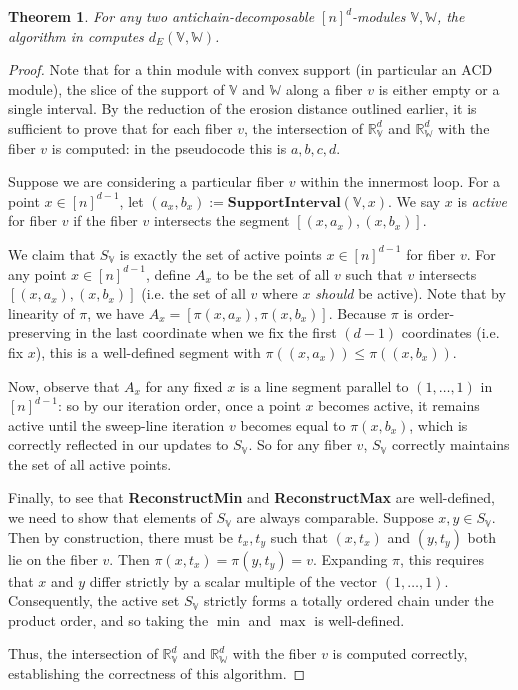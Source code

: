 \documentclass[a4paper,UKenglish,thm-restate]{article}
\newtheorem{theorem}{Theorem}[section]
\theoremstyle{definition}
\def\bbv{\mathbb{V}}
\def\bbw{\mathbb{W}}
\begin{document}
            \begin{theorem}
                For any two antichain-decomposable $[n]^d$-modules $\bbv, \bbw$, the algorithm in  computes $d_E(\bbv, \bbw)$.
            \end{theorem}
            \begin{proof}
                Note that for a thin module with convex support (in particular an ACD module), the slice of the support of $\bbv$ and $\bbw$ along a fiber $v$ is either empty or a single interval. By the reduction of the erosion distance outlined earlier, it is sufficient to prove that for each fiber $v$, the intersection of $\mathbb{R}_\bbv^d$ and $\mathbb{R}_\bbw^d$ with the fiber $v$ is computed: in the pseudocode this is $a, b, c, d$.

                Suppose we are considering a particular fiber $v$ within the innermost loop. For a point $x \in [n]^{d-1}$, let $(a_x, b_x) := \textbf{SupportInterval}(\bbv, x)$. We say $x$ is \emph{active} for fiber $v$ if the fiber $v$ intersects the segment $[(x, a_x), (x, b_x)]$.

                We claim that $S_\bbv$ is exactly the set of active points $x \in [n]^{d-1}$ for fiber $v$. For any point $x \in [n]^{d-1}$, define $A_x$ to be the set of all $v$ such that $v$ intersects $[(x, a_x), (x, b_x)]$ (i.e. the set of all $v$ where $x$ \emph{should} be active). Note that by linearity of $\pi$, we have $A_x = [\pi(x, a_x), \pi(x, b_x)]$. Because $\pi$ is order-preserving in the last coordinate when we fix the first $(d-1)$ coordinates (i.e. fix $x$), this is a well-defined segment with $\pi((x, a_x)) \leq \pi((x, b_x))$.
                
                Now, observe that $A_x$ for any fixed $x$ is a line segment parallel to $(1, \ldots, 1)$ in $[n]^{d-1}$: so by our iteration order, once a point $x$ becomes active, it remains active until the sweep-line iteration $v$ becomes equal to $\pi(x, b_x)$, which is correctly reflected in our updates to $S_\bbv$. So for any fiber $v$, $S_\bbv$ correctly maintains the set of all active points. 

                Finally, to see that \textbf{ReconstructMin} and \textbf{ReconstructMax} are well-defined, we need to show that elements of $S_\bbv$ are always comparable. Suppose $x, y \in S_\bbv$. Then by construction, there must be $t_x, t_y$ such that $(x, t_x)$ and $(y, t_y)$ both lie on the fiber $v$. Then $\pi(x, t_x) = \pi(y, t_y) = v$. Expanding $\pi$, this requires that $x$ and $y$ differ strictly by a scalar multiple of the vector $(1, \ldots, 1)$. Consequently, the active set $S_\bbv$ strictly forms a totally ordered chain under the product order, and so taking the $\min$ and $\max$ is well-defined.

                Thus, the intersection of $\mathbb{R}_\bbv^d$ and $\mathbb{R}_\bbw^d$ with the fiber $v$ is computed correctly, establishing the correctness of this algorithm.
            \end{proof}
\end{document}
